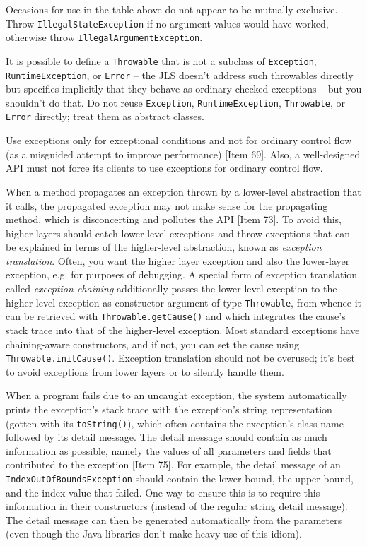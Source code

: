 \documentclass[table, xcdraw]{article}%
\begin{document}
Occasions for use in the table above do not appear to be mutually exclusive. Throw \texttt{IllegalStateException} if no argument values would have worked, otherwise throw \texttt{IllegalArgumentException}.

It is possible to define a \texttt{Throwable} that is not a subclass of \texttt{Exception}, \texttt{RuntimeException}, or \texttt{Error} -- the JLS doesn’t address such throwables directly but specifies implicitly that they behave as ordinary checked exceptions -- but you shouldn't do that. Do not reuse \texttt{Exception}, \texttt{RuntimeException}, \texttt{Throwable}, or \texttt{Error} directly; treat them as abstract classes.

Use exceptions only for exceptional conditions and not for ordinary control flow (as a misguided attempt to improve performance) [Item 69]. Also, a well-designed API must not force its clients to use exceptions for ordinary control flow.

When a method propagates an exception thrown by a lower-level abstraction that it calls, the propagated exception may not make sense for the propagating method, which is disconcerting and pollutes the API [Item 73]. To avoid this, higher layers should catch lower-level exceptions and throw exceptions that can be explained in terms of the higher-level abstraction, known as \emph{exception translation}. Often, you want the higher layer exception and also the lower-layer exception, e.g. for purposes of debugging. A special form of exception translation called \emph{exception chaining} additionally passes the lower-level exception to the higher level exception as constructor argument of type \texttt{Throwable}, from whence it can be retrieved with \texttt{Throwable.getCause()} and which integrates the cause’s stack trace into that of the higher-level exception. Most standard exceptions have chaining-aware constructors, and if not, you can set the cause using \texttt{Throwable.initCause()}. Exception translation should not be overused; it's best to avoid exceptions from lower layers or to silently handle them.

When a program fails due to an uncaught exception, the system automatically prints the exception’s stack trace with the exception’s string
representation (gotten with its \texttt{toString()}), which often contains the exception’s class name followed by its detail message. The detail message should contain as much information as possible, namely the values of all parameters and fields that contributed to the exception [Item 75]. For example, the detail message of an \texttt{IndexOutOfBoundsException} should contain the lower bound, the upper bound, and the index value that failed. One way to ensure this is to require this information in their constructors (instead of the regular string detail message). The detail message can then be generated automatically from the parameters (even though the Java libraries don’t make heavy use of this idiom).
\end{document}

